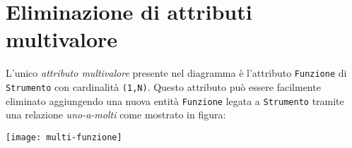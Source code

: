 \section{Eliminazione di attributi multivalore}
L'unico {\it attributo multivalore} presente nel diagramma è l'attributo {\tt Funzione} di {\tt Strumento}
con cardinalità {\tt (1,N)}. Questo attributo può essere facilmente eliminato aggiungendo
una nuova entità {\tt Funzione} legata a {\tt Strumento} tramite una relazione {\it uno-a-molti}
come mostrato in figura:

\vspace{5pt}\centerline{\texttt{[image: multi-funzione]}}

